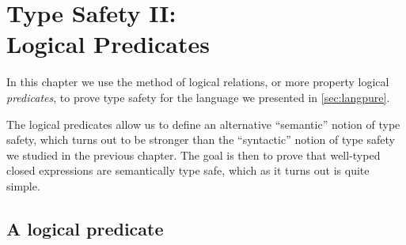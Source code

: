 \chapter[Type safety II: Logical predicates][Type safety II: Logical predicates]{\vspace{-\baselineskip}Type Safety II:\\ Logical Predicates}\label{chap:logical-predicates}

\renewcommand{\typerel}[4]{%
    \ifstrempty{#1}{%
        #2 \vdash #3 : #4%
    }{%
        #1 \mid #2 \vdash #3 : #4%
    }%
}

In this chapter we use the method of logical relations, or more property logical \emph{predicates}, to prove type safety for the language \langpure{} we presented in \cref{sec:langpure}.

The logical predicates allow us to define an alternative \enquote{semantic} notion of type safety, which turns out to be stronger than the \enquote{syntactic} notion of type safety we studied in the previous chapter. The goal is then to prove that well-typed closed expressions are semantically type safe, which as it turns out is quite simple.


\section{A logical predicate}




